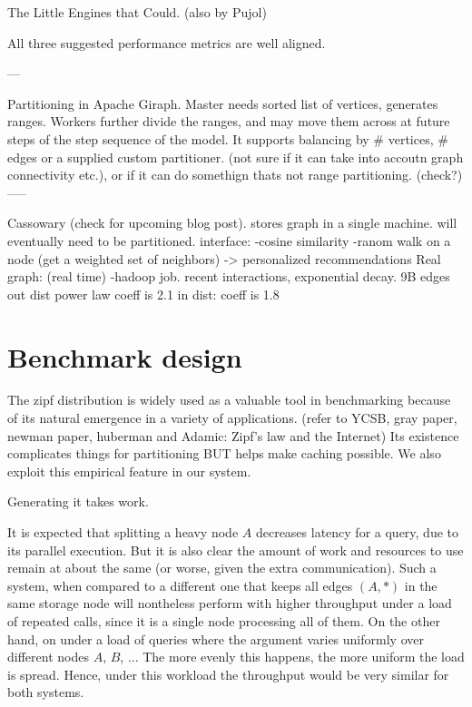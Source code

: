 \documentclass{article}
\begin{document}
The Little Engines that Could. (also by Pujol)


All three suggested performance metrics are well aligned.


---

Partitioning in Apache Giraph. Master needs sorted list of vertices, generates ranges. Workers further divide the ranges, and may move them 
across at future steps of the step sequence of the model. 
It supports balancing by # vertices, # edges or a supplied custom partitioner. (not sure if it can take into accoutn graph connectivity etc.), or if it can 
do somethign thats not range partitioning.  (check?)
-----

Cassowary (check for upcoming blog post). stores graph in a single machine. will eventually need to be partitioned.
interface:
-cosine similarity
-ranom walk on a node (get a weighted set of neighbors) -> personalized recommendations
Real graph: (real time)
-hadoop job. recent interactions, exponential decay. 9B edges
out dist power law coeff is 2.1 
in dist: coeff is 1.8




\section{Benchmark design}

The zipf distribution is widely used as a valuable tool in benchmarking because of its natural emergence in a variety of applications. (refer to YCSB, gray paper, newman paper, huberman and Adamic: 
Zipf’s law and the Internet) Its existence complicates things for partitioning BUT helps make caching possible. We also exploit this empirical feature in our system.

Generating it takes work.

It is expected that splitting a heavy node \( A \)  decreases latency for a \fanoutq[ A ] query, due to its parallel execution.  But it is also clear the amount of work and resources to use remain at about the same (or worse, given the extra communication).  Such a system, when compared to a different one that keeps all edges \( \left(A, * \right) \) in the same storage node  will nontheless perform with higher throughput under a load of repeated \fanoutq[A] calls, since it is a single node processing all of them.  On the other hand, on under a load of \fanoutq{*} queries where the argument varies uniformly over different nodes $A$, $B$, ... The more evenly this happens, the more uniform the load is spread. Hence, under this workload the throughput would be very similar for both systems.    
\end{document}
